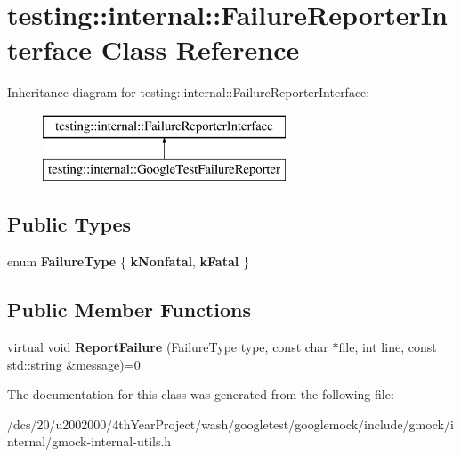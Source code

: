 \hypertarget{classtesting_1_1internal_1_1FailureReporterInterface}{}\section{testing\+:\+:internal\+:\+:Failure\+Reporter\+Interface Class Reference}
\label{classtesting_1_1internal_1_1FailureReporterInterface}
Inheritance diagram for testing\+:\+:internal\+:\+:Failure\+Reporter\+Interface\+:\begin{figure}[H]
\begin{center}
\leavevmode
\includegraphics[height=2.000000cm]{classtesting_1_1internal_1_1FailureReporterInterface}
\end{center}
\end{figure}
\subsection*{Public Types}
\begin{DoxyCompactItemize}
\item 
\mbox{\label{classtesting_1_1internal_1_1FailureReporterInterface_aba34db997df0aefbfdc9d199d7d2ab5e}} 
enum {\bfseries Failure\+Type} \{ {\bfseries k\+Nonfatal}, 
{\bfseries k\+Fatal}
 \}
\end{DoxyCompactItemize}
\subsection*{Public Member Functions}
\begin{DoxyCompactItemize}
\item 
\mbox{\label{classtesting_1_1internal_1_1FailureReporterInterface_a0c43ec1946cb4ab51279c96ce1ad941d}} 
virtual void {\bfseries Report\+Failure} (Failure\+Type type, const char $\ast$file, int line, const std\+::string \&message)=0
\end{DoxyCompactItemize}


The documentation for this class was generated from the following file\+:\begin{DoxyCompactItemize}
\item 
/dcs/20/u2002000/4th\+Year\+Project/wash/googletest/googlemock/include/gmock/internal/gmock-\/internal-\/utils.\+h\end{DoxyCompactItemize}
